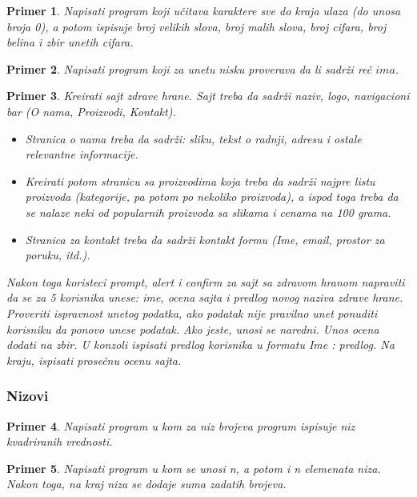 \documentclass[a4paper]{article}
\newtheorem{primer}{Primer}[section]
\begin{document}
\begin{primer}
Napisati program koji učitava karaktere sve do kraja ulaza (do unosa broja 0), a potom ispisuje broj velikih slova, broj malih slova, broj cifara, broj belina i zbir unetih cifara. 
\end{primer}

\begin{primer}
Napisati program koji za unetu nisku proverava da li sadrži reč $ima$.
\end{primer}

\begin{primer}
Kreirati sajt zdrave hrane. Sajt treba da sadrži naziv, logo, navigacioni bar (O nama, Proizvodi, Kontakt). 
\begin{itemize}
    \item Stranica o nama treba da sadrži: sliku, tekst o radnji, adresu i ostale relevantne informacije. 
    \item Kreirati potom stranicu sa proizvodima koja treba da sadrži najpre listu proizvoda (kategorije, pa potom po nekoliko proizvoda), a ispod toga treba da se nalaze neki od popularnih proizvoda sa slikama i cenama na 100 grama. 
    \item Stranica za kontakt treba da sadrži kontakt formu (Ime, email, prostor za poruku, itd.).  
\end{itemize}

Nakon toga koristeci prompt, alert i confirm za sajt sa zdravom hranom napraviti da se za 5 korisnika unese: ime, ocena sajta i predlog novog naziva zdrave hrane. Proveriti ispravnost unetog podatka, ako podatak nije pravilno unet ponuditi korisniku da ponovo unese podatak. Ako jeste, unosi se naredni. Unos ocena dodati na zbir. U konzoli ispisati predlog korisnika u formatu Ime : predlog. Na kraju, ispisati prosečnu ocenu sajta.
\end{primer}

\subsubsection{Nizovi}

\begin{primer}
Napisati program u kom za niz brojeva program ispisuje niz kvadriranih vrednosti.
\end{primer}

\begin{primer}
Napisati program u kom se unosi n, a potom i n elemenata niza. Nakon toga, na kraj niza se dodaje suma zadatih brojeva.
\end{primer}
\end{document}
